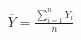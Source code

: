 \documentclass[preview]{standalone}
\begin{document}
\begin{align*}
\overline{Y} = \frac{\sum_{i=1}^{n} Y_{i}}{n}
\end{align*}
\end{document}
